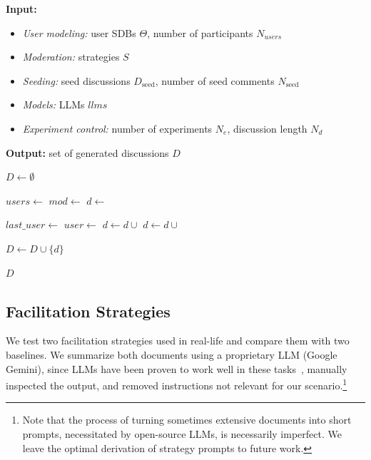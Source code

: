\begin{algorithm}[ht]
	\caption{Experimental procedure for the facilitation experiments using our \ac{sdg} framework.}
	\label{alg:exp_generation}
	\begin{flushleft}
		\textbf{Input:}
		\begin{itemize}
			\item \textit{User modeling:} user SDBs $\Theta$, number of participants $N_{users}$
			\item \textit{Moderation:} strategies $S$
			\item \textit{Seeding:} seed discussions $D_{\text{seed}}$, number of seed comments $N_{\text{seed}}$
			\item \textit{Models:} LLMs $llms$
			\item \textit{Experiment control:} number of experiments $N_e$, discussion length $N_d$
		\end{itemize}
		\textbf{Output:} set of generated discussions $D$
	\end{flushleft}
	
	\begin{algorithmic}[1]
		\State $D \gets \emptyset$
		
		
		\State $users \gets$ 
		\State $mod \gets$ 
		\State $d \gets$ 
		
		\State $last\_user \gets$ 
		\State $user \gets$ 
		\State $d \gets d \cup$ 
		\State $d \gets d \cup$ 
		\EndFor
		
		\State $D \gets D \cup \{d\}$
		\EndFor
		\EndFor
		\EndFor
		
		\State \Return $D$
	\end{algorithmic}
\end{algorithm}



\subsection{Facilitation Strategies}
\label{ssec:experimental:strategies}

We test two facilitation strategies used in real-life and compare them with two baselines. We summarize both documents using a proprietary LLM (Google Gemini), since LLMs have been proven to work well in these tasks~\cite{ts2024}, manually inspected the output, and removed instructions not relevant for our scenario.\footnote{Note that the process of turning sometimes extensive documents into short prompts, necessitated by open-source LLMs, is necessarily imperfect. We leave the optimal derivation of strategy prompts to future work.}

